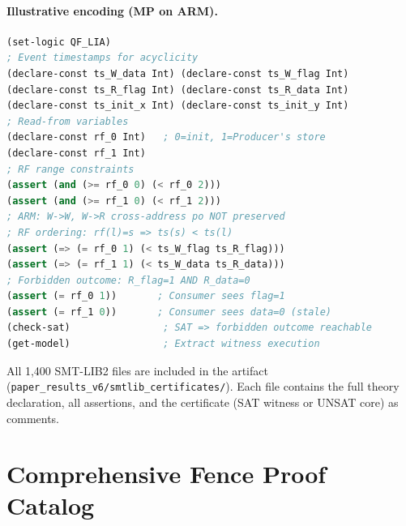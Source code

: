 \documentclass[11pt]{article}
\begin{document}
\paragraph{Illustrative encoding (MP on ARM).}
\begin{lstlisting}[language=lisp, basicstyle=\ttfamily\scriptsize, caption={SMT-LIB2 encoding for MP on ARMv8 (simplified).}, label=lst:smt-mp]
(set-logic QF_LIA)
; Event timestamps for acyclicity
(declare-const ts_W_data Int) (declare-const ts_W_flag Int)
(declare-const ts_R_flag Int) (declare-const ts_R_data Int)
(declare-const ts_init_x Int) (declare-const ts_init_y Int)
; Read-from variables
(declare-const rf_0 Int)   ; 0=init, 1=Producer's store
(declare-const rf_1 Int)
; RF range constraints
(assert (and (>= rf_0 0) (< rf_0 2)))
(assert (and (>= rf_1 0) (< rf_1 2)))
; ARM: W->W, W->R cross-address po NOT preserved
; RF ordering: rf(l)=s => ts(s) < ts(l)
(assert (=> (= rf_0 1) (< ts_W_flag ts_R_flag)))
(assert (=> (= rf_1 1) (< ts_W_data ts_R_data)))
; Forbidden outcome: R_flag=1 AND R_data=0
(assert (= rf_0 1))       ; Consumer sees flag=1
(assert (= rf_1 0))       ; Consumer sees data=0 (stale)
(check-sat)                ; SAT => forbidden outcome reachable
(get-model)                ; Extract witness execution
\end{lstlisting}

\noindent
All 1{,}400 SMT-LIB2 files are included in the artifact
(\texttt{paper\_results\_v6/smtlib\_certificates/}).
Each file contains the full theory declaration, all assertions,
and the certificate (SAT witness or UNSAT core) as comments.

\section{Comprehensive Fence Proof Catalog}
\label{app:fence-catalog}
\end{document}
